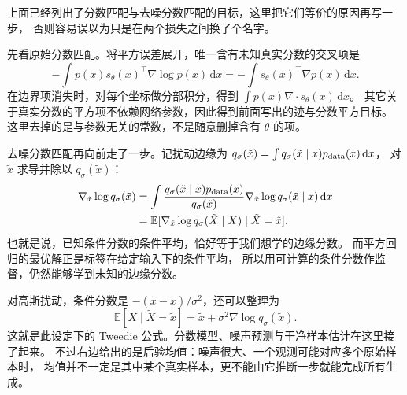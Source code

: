 上面已经列出了分数匹配与去噪分数匹配的目标，这里把它们等价的原因再写一步，
否则容易误以为只是在两个损失之间换了个名字。

先看原始分数匹配。将平方误差展开，唯一含有未知真实分数的交叉项是
\[
-\int p(x)s_\theta(x)^\top\nabla\log p(x)\,\mathrm dx
=-\int s_\theta(x)^\top\nabla p(x)\,\mathrm dx.
\]
在边界项消失时，对每个坐标做分部积分，得到
$\int p(x)\nabla\cdot s_\theta(x)\,\mathrm dx$。
其它关于真实分数的平方项不依赖网络参数，因此得到前面写出的迹与分数平方目标。
这里去掉的是与参数无关的常数，不是随意删掉含有 $\theta$ 的项。

去噪分数匹配再向前走了一步。记扰动边缘为
$q_\sigma(\tilde x)=\int q_\sigma(\tilde x\mid x)p_{\rm data}(x)\,\mathrm dx$，
对 $\tilde x$ 求导并除以 $q_\sigma(\tilde x)$：
\begin{align}
\nabla_{\tilde x}\log q_\sigma(\tilde x)
&=\int\frac{q_\sigma(\tilde x\mid x)p_{\rm data}(x)}{q_\sigma(\tilde x)}
 \nabla_{\tilde x}\log q_\sigma(\tilde x\mid x)\,\mathrm dx\\
&=\mathbb E[\nabla_{\tilde x}\log q_\sigma(\tilde X\mid X)\mid\tilde X=\tilde x].
\end{align}
也就是说，已知条件分数的条件平均，恰好等于我们想学的边缘分数。
而平方回归的最优解正是标签在给定输入下的条件平均，
所以用可计算的条件分数作监督，仍然能够学到未知的边缘分数。

对高斯扰动，条件分数是 $-(\tilde x-x)/\sigma^2$，还可以整理为
\[
\mathbb E[X\mid\tilde X=\tilde x]
=\tilde x+\sigma^2\nabla\log q_\sigma(\tilde x).
\]
这就是此设定下的 Tweedie 公式。分数模型、噪声预测与干净样本估计在这里接了起来。
不过右边给出的是后验均值：噪声很大、一个观测可能对应多个原始样本时，
均值并不一定是其中某个真实样本，更不能由它推断一步就能完成所有生成。\cite{theorybook}
